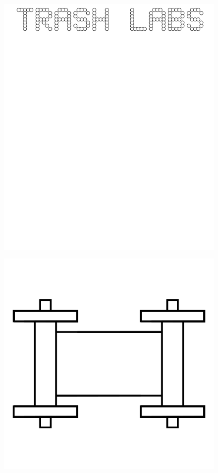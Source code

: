 \documentclass[17pt]{extreport}
\begin{document}
	\begin{figure}
		\centering
		\includegraphics[width=6.25in]{imageserver/uploadimages/trashlabs.png}
	\end{figure}
	\begin{figure}
		\centering
		\includegraphics[width=6.25in]{imageserver/uploadimages/image16.png}
	\end{figure}
\end{document}

